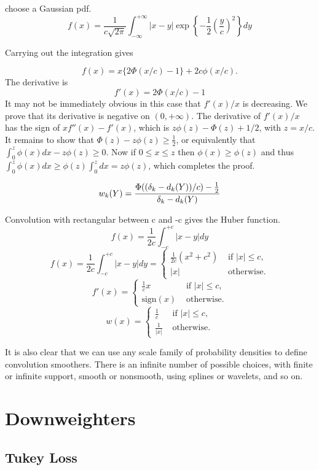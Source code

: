 \documentclass[
  12pt,
  letterpaper,
  DIV=11,
  numbers=noendperiod]{scrartcl}
\newcommand{\sectionbreak}{\pagebreak}
\begin{document}
choose a Gaussian pdf. \[
f(x)=\frac{1}{c\sqrt{2\pi}}\int_{-\infty}^{+\infty}|x-y|\exp\left\{-\frac12(\frac{y}{c})^2\right\}dy
\]

Carrying out the integration gives

\[
f(x)=x\{2\Phi(x/c)-1\}+2c\phi(x/c).
\] The derivative is \[
f'(x)=2\Phi(x/c)-1
\] It may not be immediately obvious in this case that \(f'(x)/x\) is
decreasing. We prove that its derivative is negative on \((0,+\infty)\).
The derivative of \(f'(x)/x\) has the sign of \(xf''(x)-f'(x)\), which
is \(z\phi(z)-\Phi(z)+1/2\), with \(z=x/c\). It remains to show that
\(\Phi(z)-z\phi(z)\geq\frac12\), or equivalently that
\(\int_0^z\phi(x)dx-z\phi(z)\geq 0\). Now if \(0\leq x\leq z\) then
\(\phi(x)\geq\phi(z)\) and thus
\(\int_0^z\phi(x)dx\geq\phi(z)\int_0^zdx=z\phi(z)\), which completes the
proof.

\[
w_k(Y)=
\frac{\Phi((\delta_k-d_k(Y))/c)-\frac12}{\delta_k-d_k(Y)}\\
\]

Convolution with rectangular between c and -c gives the Huber function.
\[
f(x)=\frac{1}{2c}\int_{-c}^{+c}|x-y|dy
\] \[
f(x)=\frac{1}{2c}\int_{-c}^{+c}|x-y|dy=\begin{cases}
\frac{1}{2c}(x^2+c^2)&\text{ if }|x|\leq c,\\
|x|&\text{ otherwise}.
\end{cases}
\] \[
f'(x)=\begin{cases}
\frac{1}{c}x&\text{ if }|x|\leq c,\\
\text{sign}(x)&\text{ otherwise}.
\end{cases}
\] \[
w(x)=\begin{cases}
\frac{1}{c}&\text{ if }|x|\leq c,\\
\frac{1}{|x|}&\text{ otherwise}.
\end{cases}
\]

It is also clear that we can use any scale family of probability
densities to define convolution smoothers. There is an infinite number
of possible choices, with finite or infinite support, smooth or
nonsmooth, using splines or wavelets, and so on.

\sectionbreak

\section{Downweighters}\label{downweighters}

\subsection{Tukey Loss}\label{tukey-loss}
\end{document}
